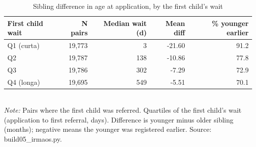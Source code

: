 \begin{table}[htbp]\centering
\caption{Sibling difference in age at application, by the first child's wait}
\label{tab:S3b_por_quartil_espera}
\small
\begin{tabular}{lrrrr}
\toprule
First child wait & N pairs & Median wait (d) & Mean diff & \% younger earlier \\
\midrule
Q1 (curta) & 19,773 & 3 & -21.60 & 91.2 \\
Q2 & 19,787 & 138 & -10.86 & 77.8 \\
Q3 & 19,786 & 302 & -7.29 & 72.9 \\
Q4 (longa) & 19,695 & 549 & -5.51 & 70.1 \\
\bottomrule
\end{tabular}
\\[3pt]{\footnotesize \textit{Note:} Pairs where the first child was referred. Quartiles of the first child's wait (application to first referral, days). Difference is younger minus older sibling (months); negative means the younger was registered earlier. Source: build05\_irmaos.py.}
\end{table}
